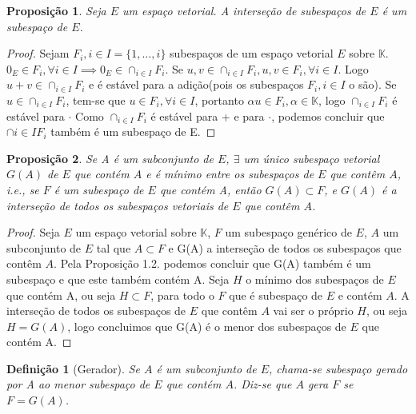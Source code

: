 \documentclass{article}
\newtheorem{proposition}{Proposição}[section]
\newtheorem{definition}{Definição}[section]
\begin{document}
	\begin{proposition}
		Seja $E$ um espaço vetorial. A interseção de subespaços de $E$ é um subespaço de $E$.
	\end{proposition}

	\begin{proof}
		Sejam $F_i, i\in I=\{1,\dots,i\}$ subespaços de um espaço vetorial $E$ sobre $\mathbb{K}$. $0_E \in F_i, \forall i \in I \implies 0_E \in \cap_{i \in I} F_i$.
		Se $u,v \in \cap_{i \in I}F_i, u,v \in F_i,\forall i \in I$. Logo $u+v \in \cap_{i \in I}F_i$ e é estável para a adição(pois os subespaços $F_i,i \in I$ o são).
		Se $u \in \cap_{i \in I}F_i$, tem-se que $u \in F_i, \forall i \in I$, portanto $\alpha u \in F_i, \alpha \in \mathbb{K}$, logo $\cap_{i\in I}F_i$ é estável para $\cdot$
		Como $\cap_{i \in I}F_i$ é estável para + e para $\cdot$, podemos concluir que $\cap{i \in I}F_i$ também é um subespaço de E.

	\end{proof}


	\begin{proposition}
		Se A é um subconjunto de $E$, $\exists$ um único subespaço vetorial $G(A)$ de $E$ que contém $A$ e é mínimo entre os subespaços de $E$ que contêm $A$, i.e., se $F$ é um subespaço de $E$ que contém A, então $G(A)\subset F$, e $G(A)$ é a interseção de todos os subespaços vetoriais de $E$ que contêm $A$.

	\end{proposition}

	\begin{proof}
		Seja $E$ um espaço vetorial sobre $\mathbb{K}$, $F$ um subespaço genérico de $E$, $A$ um subconjunto de $E$ tal que $A\subset F$ e G(A) a interseção de todos os subespaços que contêm $A$.
		Pela Proposição 1.2. podemos concluir que G(A) também é um subespaço e que este também contém A. 
		Seja $H$ o mínimo dos subespaços de $E$ que contém A, ou seja $H\subset F$, para todo o $F$ que é subespaço de $E$ e contém $A$. 
		A interseção de todos os subespaços de $E$ que contêm $A$ vai ser o próprio $H$, ou seja $H=G(A)$, logo concluimos que G(A) é o menor dos subespaços de $E$ que contém A.
	\end{proof}	

	\begin{definition}[Gerador]
		Se $A$ é um subconjunto de $E$, chama-se subespaço gerado por A ao menor subespaço de $E$ que contém $A$.
		Diz-se que $A$ gera $F$ se $F=G(A)$.

	\end{definition}
\end{document}
